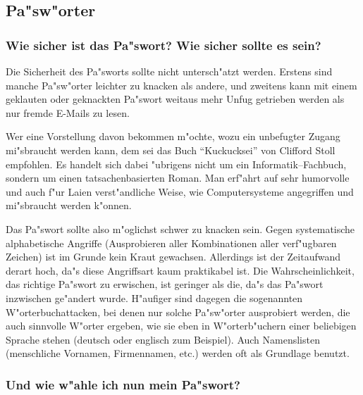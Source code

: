 
\subsection{Pa"sw"orter}
\label{passwort}


\subsubsection*{Wie sicher ist das Pa"swort? Wie sicher sollte es sein?}

Die Sicherheit des Pa"sworts sollte nicht untersch"atzt werden. Erstens sind
manche Pa"sw"orter leichter zu knacken als andere, und zweitens kann mit einem
geklauten oder geknackten Pa"swort weitaus mehr Unfug getrieben werden als nur
fremde \glossar E-Mails zu lesen.

Wer eine Vorstellung davon bekommen m"ochte, wozu ein unbefugter Zugang
mi"sbraucht werden kann, dem sei das Buch "`Kuckucksei"' von Clifford Stoll
empfohlen. Es handelt sich dabei "ubrigens nicht um ein Informatik--Fachbuch,
sondern um einen tatsachenbasierten Roman. Man erf"ahrt auf sehr humorvolle und
auch f"ur Laien verst"andliche Weise, wie Computersysteme angegriffen und
mi"sbraucht werden k"onnen. 

Das Pa"swort sollte also m"oglichst schwer zu knacken sein. Gegen systematische
alphabetische Angriffe (Ausprobieren aller Kombinationen aller verf"ugbaren
Zeichen) ist im Grunde kein Kraut gewachsen. Allerdings ist der Zeitaufwand
derart hoch, da"s diese Angriffsart kaum praktikabel ist. Die
Wahrscheinlichkeit, das richtige Pa"swort zu erwischen, ist geringer als die,
da"s das Pa"swort inzwischen ge"andert wurde. H"aufiger sind dagegen die
sogenannten W"orterbuchattacken, bei denen nur solche Pa"sw"orter ausprobiert
werden, die auch sinnvolle W"orter ergeben, wie sie eben in W"orterb"uchern einer
beliebigen Sprache stehen (deutsch oder englisch zum Beispiel). Auch
Namenslisten (menschliche Vornamen, Firmennamen, etc.) werden oft als
Grundlage benutzt.

\subsubsection*{Und wie w"ahle ich nun mein Pa"swort?}

